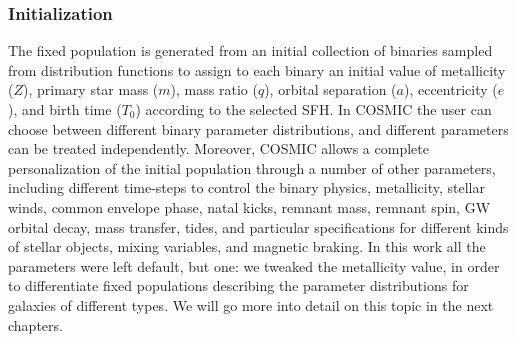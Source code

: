\subsubsection{Initialization}
The fixed population is generated from an initial collection of binaries sampled from distribution functions to assign to each binary an initial value of metallicity ($Z$), primary star mass ($m$), mass ratio ($q$), orbital separation ($a$), eccentricity ($e$), and birth time ($T_0$) according to the selected SFH.
In COSMIC the user can choose between different binary parameter distributions, and different parameters can be treated independently.
Moreover, COSMIC allows a complete personalization of the initial population through a number of other parameters, including different time-steps to control the binary physics, metallicity, stellar winds, common envelope phase, natal kicks, remnant mass, remnant spin, GW orbital decay, mass transfer, tides, and particular specifications for different kinds of stellar objects, mixing variables, and magnetic braking.
In this work all the parameters were left default, but one: we tweaked the metallicity value, in order to differentiate fixed populations describing the parameter distributions for galaxies of different types.
We will go more into detail on this topic in the next chapters.


